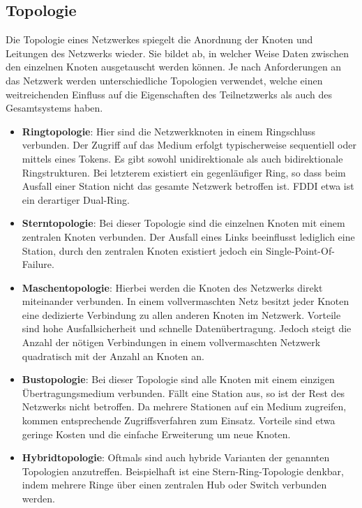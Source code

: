     \subsection{Topologie}
    Die Topologie eines Netzwerkes spiegelt die Anordnung der Knoten und Leitungen des Netzwerks wieder. Sie bildet ab, in welcher Weise Daten zwischen
    den einzelnen Knoten ausgetauscht werden können. Je nach Anforderungen an das Netzwerk werden unterschiedliche Topologien verwendet,
    welche einen weitreichenden Einfluss auf die Eigenschaften des Teilnetzwerks als auch des Gesamtsystems haben.
        \begin{itemize}
            \item \textbf{Ringtopologie}: Hier sind die Netzwerkknoten in einem Ringschluss verbunden. Der Zugriff auf das Medium erfolgt typischerweise sequentiell 
            oder mittels eines Tokens. Es gibt sowohl unidirektionale als auch bidirektionale Ringstrukturen. Bei letzterem existiert ein gegenläufiger Ring, 
            so dass beim Ausfall einer Station nicht das gesamte Netzwerk betroffen ist. FDDI etwa ist ein derartiger Dual-Ring.
            \item \textbf{Sterntopologie}: Bei dieser Topologie sind die einzelnen Knoten mit einem zentralen Knoten verbunden. Der Ausfall eines Links beeinflusst lediglich
            eine Station, durch den zentralen Knoten existiert jedoch ein Single-Point-Of-Failure. 
            \item \textbf{Maschentopologie}: Hierbei werden die Knoten des Netzwerks direkt miteinander verbunden. In einem vollvermaschten Netz besitzt jeder Knoten eine 
            dedizierte Verbindung zu allen anderen Knoten im Netzwerk. Vorteile sind hohe Ausfallsicherheit und schnelle Datenübertragung. Jedoch steigt die Anzahl der 
            nötigen Verbindungen in einem vollvermaschten Netzwerk quadratisch mit der Anzahl an Knoten an.
            \item \textbf{Bustopologie}: Bei dieser Topologie sind alle Knoten mit einem einzigen Übertragungsmedium verbunden. Fällt eine Station aus, so ist der Rest des Netzwerks
            nicht betroffen. Da mehrere Stationen auf ein Medium zugreifen, kommen entsprechende Zugriffsverfahren zum Einsatz. Vorteile sind etwa geringe Kosten und die
            einfache Erweiterung um neue Knoten.
            \item \textbf{Hybridtopologie}: Oftmals sind auch hybride Varianten der genannten Topologien anzutreffen. Beispielhaft ist eine Stern-Ring-Topologie denkbar, indem
            mehrere Ringe über einen zentralen Hub oder Switch verbunden werden.
        \end{itemize}
